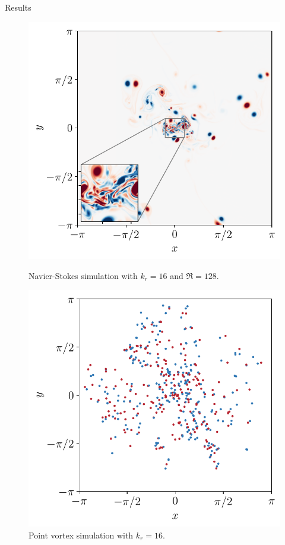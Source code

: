 \documentclass{beamer} %
\begin{document}
\begin{frame}{Results}
	\begin{figure}[ht]
		\centering
		\begin{minipage}[t]{0.44\textwidth}
			\centering
			\includegraphics[width=\textwidth]{../images/domainRe128kdn16.pdf}
			\caption{Navier-Stokes simulation with $k_r = 16$ and $\Re = 128$.}
		\end{minipage}\hspace{0.04\textwidth}
		\begin{minipage}[t]{0.44\textwidth}
			\centering
			\includegraphics[width=\textwidth]{../images/pointvortices.R4.00440.pdf}
			\caption{Point vortex simulation with $k_r = 16$.}
		\end{minipage}
	\end{figure}
\end{frame}
\end{document}
